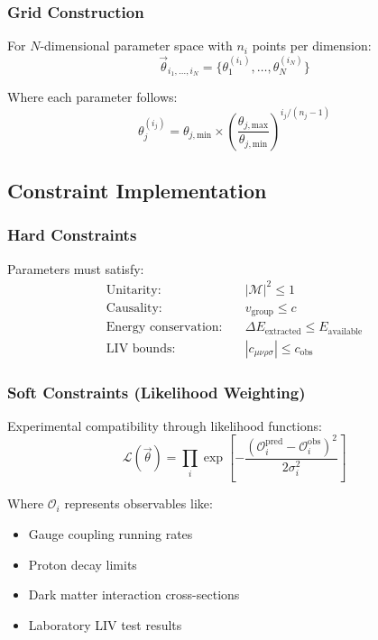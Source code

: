 \documentclass[11pt]{article}
\begin{document}
\subsubsection{Grid Construction}

For $N$-dimensional parameter space with $n_i$ points per dimension:
\begin{equation}
\vec{\theta}_{i_1,\ldots,i_N} = \{\theta_1^{(i_1)}, \ldots, \theta_N^{(i_N)}\}
\end{equation}

Where each parameter follows:
\begin{equation}
\theta_j^{(i_j)} = \theta_{j,\text{min}} \times \left(\frac{\theta_{j,\text{max}}}{\theta_{j,\text{min}}}\right)^{i_j/(n_j-1)}
\end{equation}

\subsection{Constraint Implementation}

\subsubsection{Hard Constraints}

Parameters must satisfy:
\begin{align}
\text{Unitarity:} \quad &|\mathcal{M}|^2 \leq 1 \\
\text{Causality:} \quad &v_{\text{group}} \leq c \\
\text{Energy conservation:} \quad &\Delta E_{\text{extracted}} \leq E_{\text{available}} \\
\text{LIV bounds:} \quad &|c_{\mu\nu\rho\sigma}| \leq c_{\text{obs}}
\end{align}

\subsubsection{Soft Constraints (Likelihood Weighting)}

Experimental compatibility through likelihood functions:
\begin{equation}
\mathcal{L}(\vec{\theta}) = \prod_{i} \exp\left[-\frac{(\mathcal{O}_i^{\text{pred}} - \mathcal{O}_i^{\text{obs}})^2}{2\sigma_i^2}\right]
\end{equation}

Where $\mathcal{O}_i$ represents observables like:
\begin{itemize}
    \item Gauge coupling running rates
    \item Proton decay limits
    \item Dark matter interaction cross-sections
    \item Laboratory LIV test results
\end{itemize}
\end{document}

